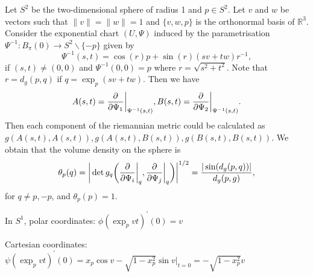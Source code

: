 \documentclass[11pt,a4paper,]{article}
\begin{document}
Let \(S^2\) be the two-dimensional sphere of radius 1 and \(p \in S^2\). Let
\(v\) and \(w\) be vectors such that \(\|v\| = \|w\| = 1\) and \(\{v, w, p\}\)
is the orthonormal basis of \(\mathbb{R}^3\). Consider the exponential
chart \((U, \Psi)\) induced by the parametrisation
\(\Psi^{-1}: B_\pi(0) \rightarrow S^2 \backslash \{-p\}\) given by \[
\Psi^{-1}(s,t) = \cos(r)p + \sin(r)(sv+tw)r^{-1},
\] if \((s,t) \neq (0,0)\) and \(\Psi^{-1}(0,0)=p\) where
\(r=\sqrt{s^2 + t^2}\). Note that \(r=d_g(p,q)\) if \(q = \exp_p(sv+tw)\).
Then we have \[
A(s,t) = \frac{\partial}{\partial \Psi_1} \bigg|_{\Psi^{-1}(s,t)}, \\
B(s,t) = \frac{\partial}{\partial \Psi_2} \bigg|_{\Psi^{-1}(s,t)}.
\] Then each component of the riemannian metric could be calculated as
\(g(A(s,t), A(s,t)), g(A(s,t), B(s,t)), g(B(s,t), B(s,t))\). We obtain
that the volume density on the sphere is \[
\theta_p(q) = \bigg| \det g_q\bigg( \frac{\partial}{\partial \Psi_i}\bigg|_q, \frac{\partial}{\partial \Psi_j}\bigg|_q \bigg) \bigg|^{1/2} \\
= \frac{|\sin(d_g(p,q))|}{d_g(p,g)},
\] for \(q \neq p, -p\), and \(\theta_p(p) = 1\).

In \(S^1\), polar coordinates: \(\phi(\exp_p{vt})^{\prime}(0) = v\)

Cartesian coordinates:
\(\psi(\exp_p{vt})^{\prime}(0) = x_p \cos{v} - \sqrt{1-x_p^2} \sin{v} \bigg|_{t=0} = - \sqrt{1 - x_p^2}v\)

\newpage

\printbibliography
\end{document}
